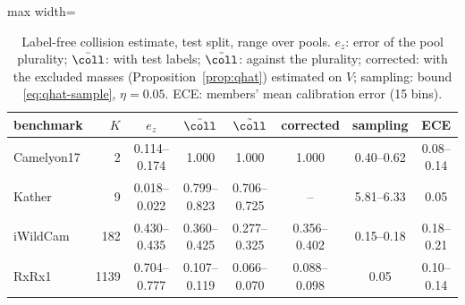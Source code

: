 \begin{table}[t]
\centering
\footnotesize
\caption{Label-free collision estimate, test split, range over pools. $e_z$: error of the pool plurality; $\bar\coll$: with test labels; $\tilde\coll$: against the plurality; corrected: with the excluded masses (Proposition~\ref{prop:qhat}) estimated on $V$; sampling: bound \eqref{eq:qhat-sample}, $\eta=0.05$. ECE: members' mean calibration error (15 bins).}
\label{tab:qhat}
\setlength{\tabcolsep}{3.5pt}\begin{adjustbox}{max width=\linewidth}
\begin{tabular}{lrcccccc}
\toprule
benchmark & $K$ & $e_z$ & $\bar\coll$ & $\tilde\coll$ & corrected & sampling & ECE \\
\midrule
Camelyon17 & 2 & 0.114--0.174 & 1.000 & 1.000 & 1.000 & 0.40--0.62 & 0.08--0.14 \\
Kather & 9 & 0.018--0.022 & 0.799--0.823 & 0.706--0.725 & -- & 5.81--6.33 & 0.05 \\
iWildCam & 182 & 0.430--0.435 & 0.360--0.425 & 0.277--0.325 & 0.356--0.402 & 0.15--0.18 & 0.18--0.21 \\
RxRx1 & 1139 & 0.704--0.777 & 0.107--0.119 & 0.066--0.070 & 0.088--0.098 & 0.05 & 0.10--0.14 \\
\bottomrule
\end{tabular}
\end{adjustbox}
\end{table}
